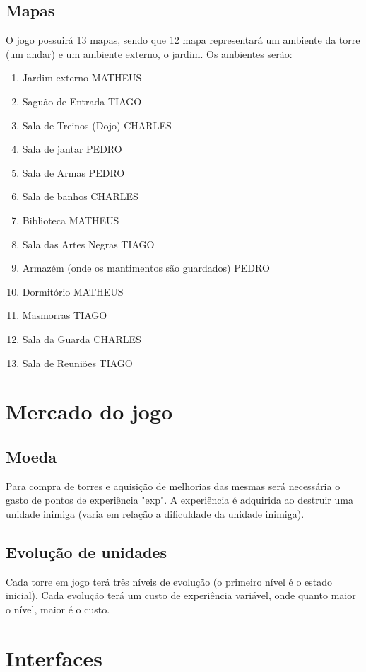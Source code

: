 \documentclass[10pt,a4paper]{article}
\begin{document}
\subsection{Mapas}
	O jogo possuirá 13 mapas, sendo que 12 mapa representará um ambiente da torre (um andar) e
um ambiente externo, o jardim. Os ambientes serão:
\begin{enumerate}
\item Jardim externo
MATHEUS
\item Saguão de Entrada
TIAGO
\item Sala de Treinos (Dojo)
CHARLES
\item Sala de jantar
PEDRO
\item Sala de Armas
PEDRO
\item Sala de banhos
CHARLES
\item Biblioteca
MATHEUS
\item Sala das Artes Negras
TIAGO
\item Armazém (onde os mantimentos são guardados)
PEDRO
\item Dormitório
MATHEUS
\item Masmorras
TIAGO
\item Sala da Guarda
CHARLES
\item Sala de Reuniões
TIAGO

\end{enumerate}

\section{Mercado do jogo}
\subsection{Moeda}
	Para compra de torres e aquisição de melhorias das mesmas será necessária o gasto de pontos
de experiência "exp". A experiência é adquirida ao destruir uma unidade inimiga (varia em relação a
dificuldade da unidade inimiga).
\subsection{Evolução de unidades}
	Cada torre em jogo terá três níveis de evolução (o primeiro nível é o estado inicial). Cada
evolução terá um custo de experiência variável, onde quanto maior o nível, maior é o custo.

\section{Interfaces}
\end{document}
